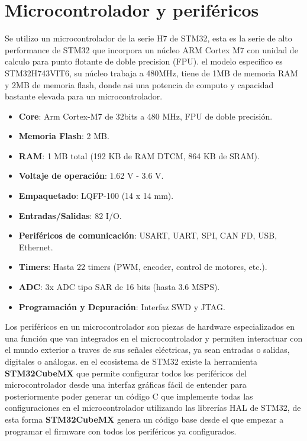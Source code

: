 \documentclass[11pt]{report}
\begin{document}
\newpage
\section{Microcontrolador y periféricos}
Se utilizo un microcontrolador de la serie H7 de STM32, esta es la serie de alto performance de STM32 que incorpora un núcleo ARM Cortex M7 con unidad de calculo para punto flotante de doble precision (FPU). el modelo especifico es STM32H743VIT6, su núcleo trabaja a 480MHz, tiene de 1MB de memoria RAM y 2MB de memoria flash, donde asi una potencia de computo y capacidad bastante elevada para un microcontrolador.

\begin{itemize}
	\item \textbf{Core}: Arm Cortex-M7 de 32bits a 480 MHz, FPU de doble precisión.
	\item \textbf{Memoria Flash}: 2 MB.
	\item \textbf{RAM}: 1 MB total (192 KB de RAM DTCM, 864 KB de SRAM).
	\item \textbf{Voltaje de operación}: 1.62 V - 3.6 V.
	\item \textbf{Empaquetado}: LQFP-100 (14 x 14 mm).
	\item \textbf{Entradas/Salidas}: 82 I/O.
	\item \textbf{Periféricos de comunicación}: USART, UART, SPI, CAN FD, USB, Ethernet.
	\item \textbf{Timers}: Hasta 22 timers (PWM, encoder, control de motores, etc.).
	\item \textbf{ADC}: 3x ADC tipo SAR de 16 bits (hasta 3.6 MSPS).
	\item \textbf{Programación y Depuración}: Interfaz SWD y JTAG.
\end{itemize}

Los periféricos en un microcontrolador son piezas de hardware especializados en una función que van integrados en el microcontrolador y permiten interactuar con el mundo exterior a traves de sus señales eléctricas, ya sean entradas o salidas, digitales o análogas. en el ecosistema de STM32 existe la herramienta \textbf{STM32CubeMX} que permite configurar todos los periféricos del microcontrolador desde una interfaz gráficas fácil de entender para posteriormente poder generar un código C que implemente todas las configuraciones en el microcontrolador utilizando las librerías HAL de STM32, de esta forma \textbf{STM32CubeMX} genera un código base desde el que empezar a programar el firmware con todos los periféricos ya configurados.
\end{document}
